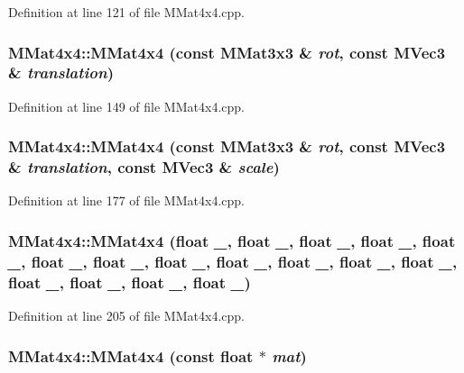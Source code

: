 Definition at line 121 of file MMat4x4.cpp.\hypertarget{class_m_mat4x4_fc1a4ed07e9d2baf9d6f333a00ee76a5}{
\subsubsection[{MMat4x4}]{\setlength{\rightskip}{0pt plus 5cm}MMat4x4::MMat4x4 (const {\bf MMat3x3} \& {\em rot}, \/  const {\bf MVec3} \& {\em translation})}}
\label{class_m_mat4x4_fc1a4ed07e9d2baf9d6f333a00ee76a5}




Definition at line 149 of file MMat4x4.cpp.\hypertarget{class_m_mat4x4_f0ab4e1ba04f32bac44bc7c8e6d5e037}{
\subsubsection[{MMat4x4}]{\setlength{\rightskip}{0pt plus 5cm}MMat4x4::MMat4x4 (const {\bf MMat3x3} \& {\em rot}, \/  const {\bf MVec3} \& {\em translation}, \/  const {\bf MVec3} \& {\em scale})}}
\label{class_m_mat4x4_f0ab4e1ba04f32bac44bc7c8e6d5e037}




Definition at line 177 of file MMat4x4.cpp.\hypertarget{class_m_mat4x4_501c2ede3902e23571147ea5273c2904}{
\subsubsection[{MMat4x4}]{\setlength{\rightskip}{0pt plus 5cm}MMat4x4::MMat4x4 (float {\em \_}, \/  float {\em \_}, \/  float {\em \_}, \/  float {\em \_}, \/  float {\em \_}, \/  float {\em \_}, \/  float {\em \_}, \/  float {\em \_}, \/  float {\em \_}, \/  float {\em \_}, \/  float {\em \_}, \/  float {\em \_}, \/  float {\em \_}, \/  float {\em \_}, \/  float {\em \_}, \/  float {\em \_})}}
\label{class_m_mat4x4_501c2ede3902e23571147ea5273c2904}




Definition at line 205 of file MMat4x4.cpp.\hypertarget{class_m_mat4x4_9276085ed15c187101647e97b63b7ee8}{
\subsubsection[{MMat4x4}]{\setlength{\rightskip}{0pt plus 5cm}MMat4x4::MMat4x4 (const float $\ast$ {\em mat})}}
\label{class_m_mat4x4_9276085ed15c187101647e97b63b7ee8}





